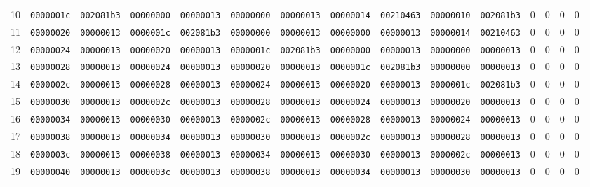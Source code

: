 \begin{tabular}{lllllllllllllll}
10 & \texttt{0000001c} & \texttt{002081b3} & \texttt{00000000} & \texttt{00000013} & \texttt{00000000} & \texttt{00000013} & \texttt{00000014} & \texttt{00210463} & \texttt{00000010} & \texttt{002081b3} & 0 & 0 & 0 & 0 \\
11 & \texttt{00000020} & \texttt{00000013} & \texttt{0000001c} & \texttt{002081b3} & \texttt{00000000} & \texttt{00000013} & \texttt{00000000} & \texttt{00000013} & \texttt{00000014} & \texttt{00210463} & 0 & 0 & 0 & 0 \\
12 & \texttt{00000024} & \texttt{00000013} & \texttt{00000020} & \texttt{00000013} & \texttt{0000001c} & \texttt{002081b3} & \texttt{00000000} & \texttt{00000013} & \texttt{00000000} & \texttt{00000013} & 0 & 0 & 0 & 0 \\
13 & \texttt{00000028} & \texttt{00000013} & \texttt{00000024} & \texttt{00000013} & \texttt{00000020} & \texttt{00000013} & \texttt{0000001c} & \texttt{002081b3} & \texttt{00000000} & \texttt{00000013} & 0 & 0 & 0 & 0 \\
14 & \texttt{0000002c} & \texttt{00000013} & \texttt{00000028} & \texttt{00000013} & \texttt{00000024} & \texttt{00000013} & \texttt{00000020} & \texttt{00000013} & \texttt{0000001c} & \texttt{002081b3} & 0 & 0 & 0 & 0 \\
15 & \texttt{00000030} & \texttt{00000013} & \texttt{0000002c} & \texttt{00000013} & \texttt{00000028} & \texttt{00000013} & \texttt{00000024} & \texttt{00000013} & \texttt{00000020} & \texttt{00000013} & 0 & 0 & 0 & 0 \\
16 & \texttt{00000034} & \texttt{00000013} & \texttt{00000030} & \texttt{00000013} & \texttt{0000002c} & \texttt{00000013} & \texttt{00000028} & \texttt{00000013} & \texttt{00000024} & \texttt{00000013} & 0 & 0 & 0 & 0 \\
17 & \texttt{00000038} & \texttt{00000013} & \texttt{00000034} & \texttt{00000013} & \texttt{00000030} & \texttt{00000013} & \texttt{0000002c} & \texttt{00000013} & \texttt{00000028} & \texttt{00000013} & 0 & 0 & 0 & 0 \\
18 & \texttt{0000003c} & \texttt{00000013} & \texttt{00000038} & \texttt{00000013} & \texttt{00000034} & \texttt{00000013} & \texttt{00000030} & \texttt{00000013} & \texttt{0000002c} & \texttt{00000013} & 0 & 0 & 0 & 0 \\
19 & \texttt{00000040} & \texttt{00000013} & \texttt{0000003c} & \texttt{00000013} & \texttt{00000038} & \texttt{00000013} & \texttt{00000034} & \texttt{00000013} & \texttt{00000030} & \texttt{00000013} & 0 & 0 & 0 & 0 \\

\end{tabular}
